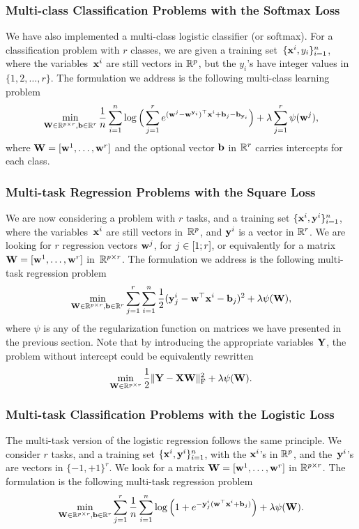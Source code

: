\documentclass[a4paper, 11pt]{article}
\begin{document}
         \subsubsection{Multi-class Classification Problems with the Softmax Loss}
         We have also implemented a multi-class logistic classifier (or softmax).
         For a classification problem with $r$ classes, we are given a training set~$\{{\mathbf x}^i,y_i\}_{i=1}^n$, where the variables~${\mathbf x}^i$ are still vectors in ${\mathbb R}^p$, but the $y_i$'s have integer values in $\{1,2,\ldots,r\}$. The formulation we address is the following multi-class learning problem
         \begin{equation}
         \min_{{\mathbf W} \in {\mathbb R}^{p \times r}, {\mathbf b} \in {\mathbb R}^r} \frac{1}{n}\sum_{i=1}^n \log\Big(\sum_{j=1}^r e^{ ({\mathbf w}^j-{\mathbf w}^{{\mathbf y}_i})^\top{\mathbf x}^i + {\mathbf b}_j-{\mathbf b}_{{\mathbf y}_i}}\Big) + \lambda\sum_{j=1}^r\psi({\mathbf w}^j),\label{software:eq:class}
         \end{equation}
         where ${\mathbf W} = [{\mathbf w}^1,\ldots,{\mathbf w}^r]$ and the optional vector ${\mathbf b}$ in ${\mathbb R}^r$ carries intercepts for each class.
         \subsubsection{Multi-task Regression Problems with the Square Loss}
         We are now considering a problem with $r$ tasks, and a training set
         $\{{\mathbf x}^i,{\mathbf y}^i\}_{i=1}^n$, where the variables~${\mathbf x}^i$ are still vectors in~${\mathbb R}^p$, and ${\mathbf y}^i$
         is a vector in ${\mathbb R}^r$. We are looking for $r$ regression vectors ${\mathbf w}^j$, for $j\in [ 1;r ]$, or equivalently for a matrix ${\mathbf W}=[{\mathbf w}^1,\ldots,{\mathbf w}^r]$ in~${\mathbb R}^{p \times r}$. The formulation we address is the following
         multi-task regression problem
         \begin{displaymath}
         \min_{{\mathbf W} \in {\mathbb R}^{p \times r}, {\mathbf b} \in {\mathbb R}^r} \sum_{j=1}^r\sum_{i=1}^n \frac{1}{2}({\mathbf y}^i_j-{\mathbf w}^\top{\mathbf x}^i-{\mathbf b}_j)^2 + \lambda\psi({\mathbf W}),
         \end{displaymath}
         where $\psi$ is any of the regularization function on matrices we have presented in the previous section.
         Note that by introducing the appropriate variables ${\mathbf Y}$, the problem without intercept could be equivalently rewritten
         \begin{displaymath}
   \min_{{\mathbf W} \in {\mathbb R}^{p \times r}} \frac{1}{2} \|{\mathbf Y}-{\mathbf X}{\mathbf W}\|_{\text{F}}^2 + \lambda\psi({\mathbf W}).
   \end{displaymath}
   \subsubsection{Multi-task Classification Problems with the Logistic Loss}
   The multi-task version of the logistic regression follows the same principle.
   We consider $r$ tasks, and a training set
   $\{{\mathbf x}^i,{\mathbf y}^i\}_{i=1}^n$, with the ${\mathbf x}^i$'s in ${\mathbb R}^p$, and the~${\mathbf y}^i$'s
   are vectors in $\{-1,+1\}^r$. We look for a matrix ${\mathbf W}=[{\mathbf w}^1,\ldots,{\mathbf w}^r]$ in ${\mathbb R}^{p \times r}$. The formulation is the following
   multi-task regression problem
   \begin{displaymath}
   \min_{{\mathbf W} \in {\mathbb R}^{p \times r}, {\mathbf b} \in {\mathbb R}^r} \sum_{j=1}^r\frac{1}{n}\sum_{i=1}^n \log\Big(1+e^{-{\mathbf y}^i_j({\mathbf w}^\top{\mathbf x}^i+{\mathbf b}_j)}\Big) + \lambda\psi({\mathbf W}).
   \end{displaymath}
\end{document}
